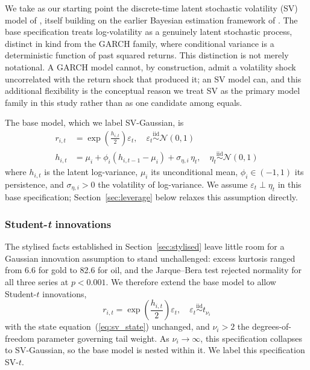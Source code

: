 \documentclass[preprint,12pt,authoryear]{elsarticle}
\begin{document}
We take as our starting point the discrete-time latent stochastic volatility (SV) model of \citet{kimshephardchib1998}, itself building on the earlier Bayesian estimation framework of \citet{jacquierpolsonrossi1994}. The base specification treats log-volatility as a genuinely latent stochastic process, distinct in kind from the GARCH family, where conditional variance is a deterministic function of past squared returns. This distinction is not merely notational. A GARCH model cannot, by construction, admit a volatility shock uncorrelated with the return shock that produced it; an SV model can, and this additional flexibility is the conceptual reason we treat SV as the primary model family in this study rather than as one candidate among equals.

The base model, which we label SV-Gaussian, is
\begin{align}
  r_{i,t} &= \exp\!\left(\frac{h_{i,t}}{2}\right) \varepsilon_t, \quad \varepsilon_t \overset{\text{iid}}{\sim} \mathcal{N}(0,1) \label{eq:sv_obs}\\
  h_{i,t} &= \mu_i + \phi_i (h_{i,t-1} - \mu_i) + \sigma_{\eta,i}\, \eta_t, \quad \eta_t \overset{\text{iid}}{\sim} \mathcal{N}(0,1) \label{eq:sv_state}
\end{align}
where $h_{i,t}$ is the latent log-variance, $\mu_i$ its unconditional mean, $\phi_i \in (-1,1)$ its persistence, and $\sigma_{\eta,i} > 0$ the volatility of log-variance. We assume $\varepsilon_t \perp \eta_t$ in this base specification; Section~\ref{sec:leverage} below relaxes this assumption directly.

\subsubsection{Student-\emph{t} innovations}

The stylised facts established in Section~\ref{sec:stylised} leave little room for a Gaussian innovation assumption to stand unchallenged: excess kurtosis ranged from 6.6 for gold to 82.6 for oil, and the Jarque--Bera test rejected normality for all three series at $p<0.001$. We therefore extend the base model to allow Student-$t$ innovations,
\begin{equation}
  r_{i,t} = \exp\!\left(\frac{h_{i,t}}{2}\right) \varepsilon_t, \quad \varepsilon_t \overset{\text{iid}}{\sim} t_{\nu_i}
  \label{eq:svt_obs}
\end{equation}
with the state equation~(\ref{eq:sv_state}) unchanged, and $\nu_i > 2$ the degrees-of-freedom parameter governing tail weight. As $\nu_i \to \infty$, this specification collapses to SV-Gaussian, so the base model is nested within it. We label this specification SV-$t$.
\end{document}
